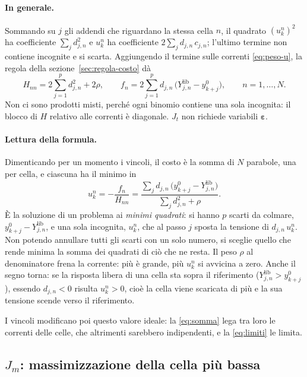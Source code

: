 \documentclass[11pt,a4paper]{article}
\newcommand{\vett}[1]{\boldsymbol{#1}}      %
\newcommand{\lib}{\mathrm{lib}}             %
\begin{document}
\paragraph{In generale.} Sommando su $j$ gli addendi che riguardano la stessa
cella $n$, il quadrato
$(u^n_k)^2$ ha coefficiente $\sum_j d_{j,n}^2$ e $u^n_k$ ha coefficiente
$2\sum_j d_{j,n}\,c_{j,n}$; l'ultimo termine non contiene incognite e si
scarta. Aggiungendo il termine sulle correnti \eqref{eq:peso-u}, la regola
della sezione~\ref{sec:regola-costo} dà
\begin{equation}
  H_{nn} = 2\sum_{j=1}^{p} d_{j,n}^2 + 2\rho , \qquad
  f_n = 2\sum_{j=1}^{p} d_{j,n}\,\bigl(Y^\lib_{j,n} - y^0_{k+j}\bigr) ,
  \qquad n = 1,\dots,N .
  \label{eq:jt-hf}
\end{equation}
Non ci sono prodotti misti, perché ogni binomio contiene una sola incognita:
il blocco di $H$ relativo alle correnti è diagonale. $J_t$ non richiede
variabili $\vett{\varepsilon}$.

\paragraph{Lettura della formula.} Dimenticando per un momento i vincoli, il
costo è la somma di $N$ parabole, una per cella, e ciascuna ha il minimo in
\[
  u^n_k = -\frac{f_n}{H_{nn}}
      = \frac{\sum_j d_{j,n}\,\bigl(y^0_{k+j} - Y^\lib_{j,n}\bigr)}
             {\sum_j d_{j,n}^2 + \rho} .
\]
È la soluzione di un problema ai \emph{minimi quadrati}: si hanno $p$ scarti
da colmare, $y^0_{k+j} - Y^\lib_{j,n}$, e una sola incognita, $u^n_k$, che al passo $j$
sposta la tensione di $d_{j,n}\,u^n_k$. Non potendo annullare tutti gli scarti
con un solo numero, si sceglie quello che rende minima la somma dei quadrati
di ciò che ne resta. Il peso $\rho$ al denominatore frena la corrente: più è
grande, più
$u^n_k$ si avvicina a zero. Anche il segno torna: se la risposta libera di una
cella sta sopra il riferimento ($Y^\lib_{j,n} > y^0_{k+j}$), essendo $d_{j,n} < 0$
risulta $u^n_k > 0$, cioè la cella viene scaricata di più e la sua tensione
scende verso il riferimento.

I vincoli modificano poi questo valore ideale: la \eqref{eq:somma} lega tra
loro le correnti delle celle, che altrimenti sarebbero indipendenti, e la
\eqref{eq:limiti} le limita.

\subsection{$J_m$: massimizzazione della cella più bassa}\label{sec:jm}
\end{document}
